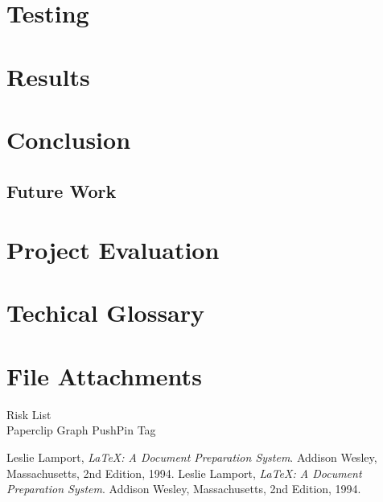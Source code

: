\documentclass[12pt]{article}
\begin{document}
\section{Testing}\label{teting}
\section{Results}\label{results}
\section{Conclusion}\label{conclusion}
    \subsection{Future Work}\label{future}
\section{Project Evaluation}\label{evaluation}

\appendix
\section{Techical Glossary}\label{glossary}
    
\section{File Attachments}\label{attachments}
     Risk List
    \\
     Paperclip
     Graph
     PushPin
     Tag




\begin{thebibliography}{0}
     Leslie Lamport,
        \emph{\LaTeX: A Document Preparation System}.
        Addison Wesley, Massachusetts,
        2nd Edition,
        1994.
        Leslie Lamport,
        \emph{\LaTeX: A Document Preparation System}.
        Addison Wesley, Massachusetts,
        2nd Edition,
        1994.
\end{thebibliography}
\end{document}
